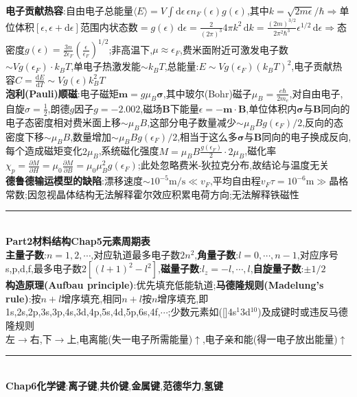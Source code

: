 \documentclass[UTF8,10pt,a4paper]{article}
\begin{document}
\begin{multicols}{2}
\textbf{电子贡献热容}:自由电子总能量$\langle E\rangle=V\int\mathrm{d}\epsilon\,\epsilon n_F(\epsilon)g(\epsilon)$,其中$k=\sqrt{2m\epsilon}/\hbar\Rightarrow$单位体积$[\epsilon,\epsilon+\mathrm{d}\epsilon]$范围内状态数$=g(\epsilon)\,\mathrm{d}\epsilon=\frac{2}{(2\pi)^3}4\pi k^2\,\mathrm{d}k=\frac{(2m)^{3/2}}{2\pi^2\hbar^3}\epsilon^{1/2}\,\mathrm{d}\epsilon\Rightarrow$态密度$g(\epsilon)=\frac{3n}{2\epsilon_F}(\frac{\epsilon}{\epsilon_F})^{1/2}$;非高温下,$\mu\approx\epsilon_F$,费米面附近可激发电子数$\sim Vg(\epsilon_F)\cdot k_BT$,单电子热激发能$\sim k_BT$,总能量:$E\sim Vg(\epsilon_F)(k_BT)^2$,电子贡献热容$C=\frac{\mathrm{d}E}{\mathrm{d}T}\sim Vg(\epsilon)k_B^2T$\\
\textbf{泡利(Pauli)顺磁}:电子磁矩$\bm{m}=g\mu_B\bm{\sigma}$,其中玻尔(Bohr)磁子$\mu_B=\frac{e\hbar}{2m_e}$,对自由电子,自旋$\sigma=\frac{1}{2}$,朗德$g$因子$g=-2.002$,磁场$\bm{B}$下能量$\epsilon=-\bm{m}\cdot\bm{B}$,单位体积内$\bm{\sigma}$与$\bm{B}$同向的电子态密度相对费米面上移$\sim\mu_BB$,这部分电子数量减少$\sim\mu_BBg(\epsilon_F)/2$,反向的态密度下移$\sim\mu_BB$,数量增加$\sim\mu_BBg(\epsilon_F)/2$,相当于这么多$\bm{\sigma}$与$\bm{B}$同向的电子换成反向,每个造成磁矩变化$2\mu_B$,系统磁化强度$M=\mu_BB\frac{g(\epsilon_F)}{2}\cdot 2\mu_B$,磁化率$\chi_p=\frac{\partial M}{\partial H}=\mu_0\frac{\partial M}{\partial B}=\mu_0\mu_B^2g(\epsilon_F)$;此处忽略费米-狄拉克分布,故结论与温度无关\\
\textbf{德鲁德输运模型的缺陷}:漂移速度$\sim 10^{-5}\text{m}/\text{s}\ll v_F$,平均自由程$v_F\tau=10^{-6}\text{m}\gg$晶格常数;因忽视晶体结构无法解释霍尔效应积累电荷方向;无法解释铁磁性\\
\rule{\columnwidth}{.2pt}\\
\textbf{Part2材料结构Chap5元素周期表}\\
\textbf{主量子数}:$n=1,2,\cdots$,对应轨道最多电子数$2n^2$,\textbf{角量子数}:$l=0,\cdots,n-1$,对应序号s,p,d,f,最多电子数$2[(l+1)^2-l^2]$,\textbf{磁量子数}:$l_z=-l,\cdots,l$,\textbf{自旋量子数}:$\pm 1/2$\\
\textbf{构造原理(Aufbau principle)}:优先填充低能轨道;\textbf{马德隆规则(Madelung's rule)}:按$n+l$增序填充,相同$n+l$按$n$增序填充,即1s,2s,2p,3s,3p,4s,3d,4p,5s,4d,5p,6s,4f,$\cdots$;少数元素如([]4s$^1$3d$^{10}$)及成键时或违反马德隆规则\\
左$\rightarrow$右,下$\rightarrow$上,电离能(失一电子所需能量)$\uparrow$,电子亲和能(得一电子放出能量)$\uparrow$\\
\rule{\columnwidth}{.2pt}\\
\textbf{Chap6化学键}:\textbf{离子键},\textbf{共价键},\textbf{金属键},\textbf{范德华力},\textbf{氢键}\\

\end{multicols}
\end{document}

